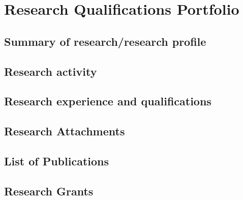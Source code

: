 \chapter{Research Qualifications Portfolio}

\section{Summary of research/research profile} \label{sec:summary-of-research-research-profile}

\section{Research activity} \label{sec:research-activity}

\section{Research experience and qualifications} \label{sec:research-experience-and-qualifications}

\section{Research Attachments} \label{sec:research-attachments}

\section{List of Publications} \label{sec:list-of-publications}

\section{Research Grants} \label{sec:research-grants}
